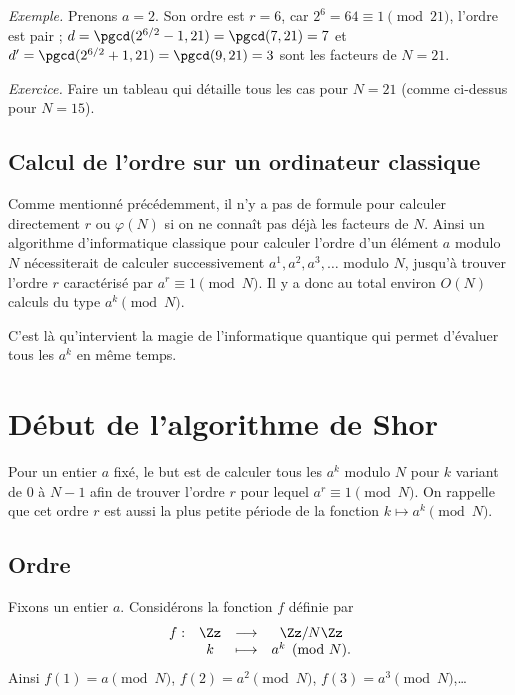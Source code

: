 \documentclass[11pt,class=report,crop=false]{standalone}
\begin{document}
\emph{Exemple.}
Prenons $a=2$. Son ordre est $r=6$, car $2^6 = 64 \equiv 1 \pmod{21}$, l'ordre est pair ; $d=\pgcd(2^{6/2}-1,21)=\pgcd(7,21)=7$ et $d'=\pgcd(2^{6/2}+1,21)=\pgcd(9,21)=3$ sont les facteurs de $N=21$. 

\medskip

\emph{Exercice.} Faire un tableau qui détaille tous les cas pour $N=21$ (comme ci-dessus pour $N=15$).


\subsection{Calcul de l'ordre sur un ordinateur classique}

Comme mentionné précédemment, il n'y a pas de formule pour calculer directement $r$ ou $\varphi(N)$ si on ne connaît pas déjà les facteurs de $N$.
Ainsi un algorithme d'informatique classique pour calculer l'ordre d'un élément $a$ modulo $N$ nécessiterait de calculer successivement 
$a^1, a^2, a^3,\ldots $ modulo $N$, jusqu'à trouver l'ordre $r$ caractérisé par $a^r \equiv 1 \pmod N$.
Il y a donc au total environ $O(N)$ calculs du type $a^k \pmod N$.

C'est là qu'intervient la magie de l'informatique quantique qui permet d'évaluer tous les $a^k$ en même temps.




\section{Début de l'algorithme de Shor}

Pour un entier $a$ fixé, le but est de calculer tous les $a^k$ modulo $N$ pour $k$ variant de $0$ à $N-1$ afin de trouver l'ordre $r$ pour lequel $a^r \equiv 1 \pmod N$. On rappelle que cet ordre $r$ est aussi la plus petite période de la fonction $k \mapsto a^k \pmod{N}$.


\subsection{Ordre}


Fixons un entier $a$.  
Considérons la fonction $f$ définie par
$$
\begin{array}{cccc}
f : & \Zz & \longrightarrow & \Zz/N\Zz \\
    & k        &\longmapsto      & a^k \pmod N.
\end{array}
$$
Ainsi $f(1) = a \pmod N$, $f(2) = a^2 \pmod N$, $f(3) = a^3 \pmod N$,\ldots
\end{document}
